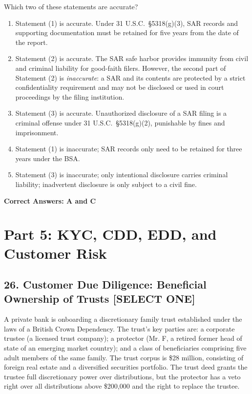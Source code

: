 \documentclass[11pt,a4paper]{article}
\begin{document}
	Which two of these statements are accurate?
	
	\begin{enumerate}[label=\Alph*.]
		\item Statement (1) is accurate. Under 31 U.S.C.\ \S 5318(g)(3), SAR records and supporting documentation must be retained for five years from the date of the report.
		\item Statement (2) is accurate. The SAR safe harbor provides immunity from civil and criminal liability for good-faith filers. However, the second part of Statement (2) is \textit{inaccurate}: a SAR and its contents are protected by a strict confidentiality requirement and may not be disclosed or used in court proceedings by the filing institution.
		\item Statement (3) is accurate. Unauthorized disclosure of a SAR filing is a criminal offense under 31 U.S.C.\ \S 5318(g)(2), punishable by fines and imprisonment.
		\item Statement (1) is inaccurate; SAR records only need to be retained for three years under the BSA.
		\item Statement (3) is inaccurate; only intentional disclosure carries criminal liability; inadvertent disclosure is only subject to a civil fine.
	\end{enumerate}
	\textbf{Correct Answers: A and C}
	
	\section{Part 5: KYC, CDD, EDD, and Customer Risk}
	
	\subsection{26. Customer Due Diligence: Beneficial Ownership of Trusts \textnormal{[SELECT ONE]}}
	
	A private bank is onboarding a discretionary family trust established under the laws of a British Crown Dependency. The trust's key parties are: a corporate trustee (a licensed trust company); a protector (Mr. F, a retired former head of state of an emerging market country); and a class of beneficiaries comprising five adult members of the same family. The trust corpus is \$28 million, consisting of foreign real estate and a diversified securities portfolio. The trust deed grants the trustee full discretionary power over distributions, but the protector has a veto right over all distributions above \$200,000 and the right to replace the trustee.
	
\end{document}
